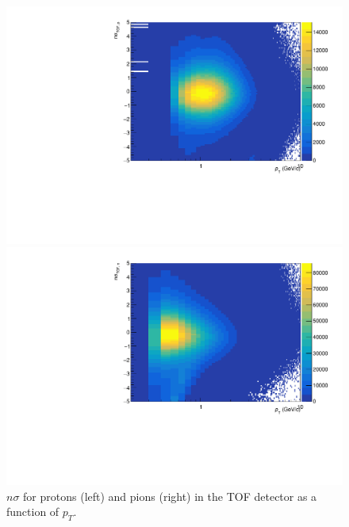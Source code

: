 \begin{figure}[h]
	\centering
	\begin{minipage}{0.48\textwidth}
		\includegraphics[width=\textwidth]{figures/analysis/nsigma_tof_proton.pdf}
	\end{minipage}
	\begin{minipage}{0.48\textwidth}
		\includegraphics[width=\textwidth]{figures/analysis/nsigma_tof_pion.pdf}
	\end{minipage}
    \caption{$n\sigma$ for protons (left) and pions (right) in the TOF detector as a function of $p_{T}$.}
	\label{fig:nsigma_tof}
\end{figure}

\clearpage

